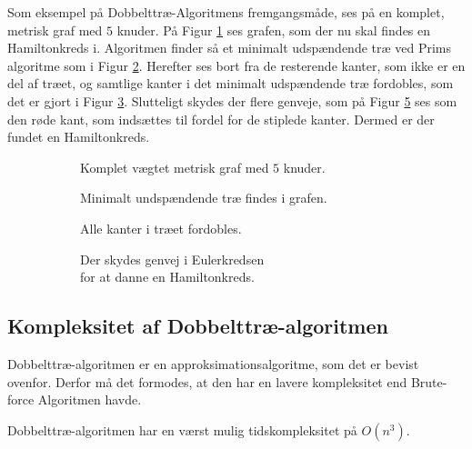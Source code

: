 \begin{exmp}
	Som eksempel på Dobbelttræ-Algoritmens fremgangsmåde, ses på en komplet, metrisk graf med $5$ knuder.
På Figur \ref{dtex1} ses grafen, som der nu skal findes en Hamiltonkreds i.
	Algoritmen finder så et minimalt udspændende træ ved Prims algoritme som i Figur \ref{dtex2}.
	Herefter ses bort fra de resterende kanter, som ikke er en del af træet, og samtlige kanter i det minimalt udspændende træ fordobles, som det er gjort i Figur \ref{dtex3}.
	Slutteligt skydes der flere genveje, som på Figur \ref{dtex4} ses som den røde kant, som indsættes til fordel for de stiplede kanter. Dermed er der fundet en Hamiltonkreds.

\begin{figure}[h]
\centering
	\begin{subfigure}{0.5\textwidth}
		\centering
			\scalebox{0.7}{}
		\label{dtex1}
		\caption{Komplet vægtet metrisk graf med $5$ knuder.}
	\end{subfigure}%
	\begin{subfigure}{0.5\textwidth}
		\centering
			\scalebox{0.7}{}
		\label{dtex2}
		\caption{Minimalt undspændende træ findes i grafen.}
	\end{subfigure}
	\newline
	\begin{subfigure}{0.5\textwidth}
		\centering		
			\scalebox{0.7}{}
		\label{dtex3}
		\caption{Alle kanter i træet fordobles.}
	\end{subfigure}%
	\begin{subfigure}{0.5\textwidth}
		\centering
			\scalebox{0.7}{}
		\label{dtex4}
		\caption{Der skydes genvej i Eulerkredsen\\ for at
		danne en Hamiltonkreds.}
	\end{subfigure}
	\caption{}
\end{figure}
\end{exmp}

\subsection{Kompleksitet af Dobbelttræ-algoritmen}
Dobbelttræ-algoritmen er en approksimationsalgoritme, som det er bevist ovenfor. Derfor må det formodes, at den har en lavere kompleksitet end Brute-force Algoritmen havde.

\begin{thm}
Dobbelttræ-algoritmen har en værst mulig tidskompleksitet på $O(n^3)$.
\end{thm}

